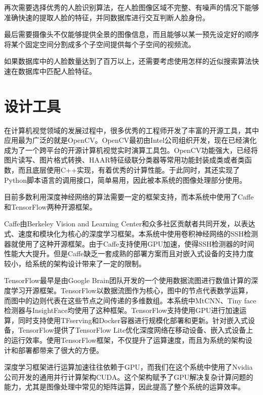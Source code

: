 再次需要选择优秀的人脸识别算法，在人脸图像区域不完整、有噪声的情况下能够准确快速的提取人脸的特征，并同数据库进行交互判断人脸身份。

最后需要摄像头不仅能够提供全景的图像信息，而且能够以某一预先设定好的顺序将某个固定空间分割成多个子空间提供每个子空间的视频流。

如果数据库中的人脸数量达到了百万以上，还需要考虑使用怎样的近似搜索算法快速在数据库中匹配人脸特征。

\section{设计工具}

在计算机视觉领域的发展过程中，很多优秀的工程师开发了丰富的开源工具，其中应用最为广泛的就是OpenCV\cite{opencv_library}。OpenCV最初由Intel公司组织开发，现在已经演化成为了一个跨平台的开源计算机视觉实时演算工具包。OpenCV功能强大，已经将图片读写、图片格式转换、HAAR特征级联分类器等常用功能封装成类或者类函数，而且底层使用C++实现，有着优秀的计算性能。于此同时，其还实现了Python脚本语言的调用接口，简单易用，因此被本系统的图像处理部分使用。

目前多数利用深度神经网络的算法需要一定的框架支持，而本系统中使用了Caffe\cite{jia2014caffe}和TensorFlow\cite{tensorflow2015-whitepaper}两种开源框架。

Caffe由Berkeley Vision and Learning Center和众多社区贡献者共同开发，以表达式、速度和模块化为核心的深度学习框架。本系统中使用卷积神经网络的SSH检测器就使用了这种开源框架。由于Caffe支持使用GPU加速，使得SSH检测器的时间性能大大提升。但是Caffe缺乏一套成熟的部署方案而且对嵌入式设备的支持力度较小，给系统的架构设计带来了一定的限制。

TensorFlow最早是由Google Brain团队开发的一个使用数据流图进行数值计算的深度学习开源框架。TensorFlow以数据流图作为核心，图中的节点代表数学运算，而图中的边则代表在这些节点之间传递的多维数组。本系统中MtCNN\cite{zhang2016joint}、Tiny face检测器\cite{hu2017finding}与InsightFace\cite{deng2018arcface}均使用了这种框架。TensorFlow支持使用GPU进行加速运算，同时支持使用TFserving和Docker容器进行规模化部署和更新。针对嵌入式设备，TensorFlow提供了TensorFlow Lite优化深度网络在移动设备、嵌入式设备上的运行效率。使用TensorFlow框架，不仅提升了运算速度，而且为系统的架构设计和部署都带来了很大的方便。

深度学习框架进行运算加速往往依赖于GPU，而我们在这个系统中使用了Nvidia公司开发的通用并行计算架构CUDA\cite{nickolls2008scalable}。这个架构赋予了GPU解决复杂计算问题的能力，尤其是图像处理中常见的矩阵运算，因此提高了整个系统的运算效率。

